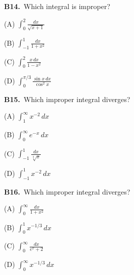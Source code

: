 \documentclass[11pt]{article}
\begin{document}
\bigskip\noindent\textbf{B14.}\ Which integral is improper?
\begin{list}{}{\setlength{\leftmargin}{3em}\setlength{\labelwidth}{2.5em}\setlength{\itemsep}{0pt}\setlength{\topsep}{2pt}}
\item[(A)] $\int_0^2\frac{dx}{\sqrt{x+1}}$
\item[(B)] $\int_{-1}^1\frac{dx}{1+x^2}$
\item[(C)] $\int_0^2\frac{x\,dx}{1-x^2}$
\item[(D)] $\int_0^{\pi/3}\frac{\sin x\,dx}{\cos^2x}$
\end{list}

\bigskip\noindent\textbf{B15.}\ Which improper integral diverges?
\begin{list}{}{\setlength{\leftmargin}{3em}\setlength{\labelwidth}{2.5em}\setlength{\itemsep}{0pt}\setlength{\topsep}{2pt}}
\item[(A)] $\int_1^\infty x^{-2}\,dx$
\item[(B)] $\int_0^\infty e^{-x}\,dx$
\item[(C)] $\int_{-1}^1\frac{dx}{\sqrt[3]x}$
\item[(D)] $\int_{-1}^1x^{-2}\,dx$
\end{list}

\bigskip\noindent\textbf{B16.}\ Which improper integral diverges?
\begin{list}{}{\setlength{\leftmargin}{3em}\setlength{\labelwidth}{2.5em}\setlength{\itemsep}{0pt}\setlength{\topsep}{2pt}}
\item[(A)] $\int_0^\infty\frac{dx}{1+x^2}$
\item[(B)] $\int_0^1x^{-1/3}\,dx$
\item[(C)] $\int_0^\infty\frac{dx}{e^x+2}$
\item[(D)] $\int_0^\infty x^{-1/3}\,dx$
\end{list}
\end{document}
